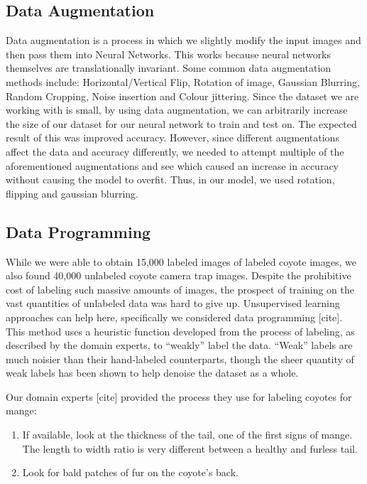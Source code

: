 \documentclass{article}
\begin{document}
\subsection{Data Augmentation}
Data augmentation is a process in which we slightly modify the input images and
then pass them into Neural Networks. This works because neural networks
themselves are translationally invariant. Some common data augmentation methods
include: Horizontal/Vertical Flip, Rotation of image, Gaussian Blurring, Random
Cropping, Noise insertion and Colour jittering. Since the dataset we are working
with is small, by using data augmentation, we can arbitrarily increase the size
of our dataset for our neural network to train and test on. The expected result
of this was improved accuracy. However, since different augmentations affect the
data and accuracy differently, we needed to attempt multiple of the
aforementioned augmentations and see which caused an increase in accuracy
without causing the model to overfit. Thus, in our model, we used rotation,
flipping and gaussian blurring.
\subsection{Data Programming}
While we were able to obtain 15,000 labeled images of labeled coyote images, we
also found 40,000 unlabeled coyote camera trap images. Despite the prohibitive
cost of labeling such massive amounts of images, the prospect of training on the
vast quantities of unlabeled data was hard to give up. Unsupervised learning
approaches can help here, specifically we considered data programming [cite].
This method uses a heuristic function developed from the process of labeling, as
described by the domain experts, to “weakly” label the data. “Weak” labels are
much noisier than their hand-labeled counterparts, though the sheer quantity of
weak labels has been shown to help denoise the dataset as a whole.

Our domain experts [cite] provided the process they use for labeling coyotes for
mange:
\begin{enumerate}
    \item If available, look at the thickness of the tail, one of the first
    signs of mange. The length to width ratio is very different between a
    healthy and furless tail.
    \item Look for bald patches of fur on the coyote’s back.
\end{enumerate}
\end{document}
